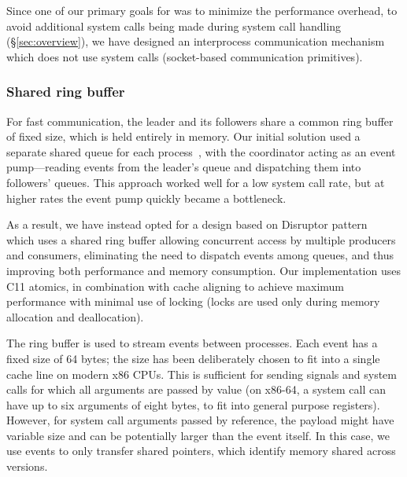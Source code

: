Since one of our primary goals for \vx was to minimize the performance
overhead, to avoid additional system calls being made during system call
handling (\S\ref{sec:overview}), we have designed an interprocess communication
mechanism which does not use system calls (\eg socket-based communication
primitives).

\subsubsection{Shared ring buffer}
\label{sec:ring}

For fast communication, the leader and its followers share a common
ring buffer of fixed size, which is held entirely in memory.  Our
initial solution used a separate shared queue for each
process~\cite{fastforward,mcringbuffer}, with the
coordinator acting as an event pump---reading events from the leader's
queue and dispatching them into followers' queues.  This approach
worked well for a low system call rate, but at higher rates the event
pump quickly became a bottleneck.  

As a result, we have instead opted for a design based on Disruptor
pattern~\cite{disruptor} which uses a shared ring buffer allowing concurrent
access by multiple producers and consumers, eliminating the need to dispatch
events among queues, and thus improving both performance and memory
consumption.  Our implementation uses C11 atomics, 
in combination with cache aligning to
achieve maximum performance with minimal use of locking (locks are used only
during memory allocation and deallocation).

The ring buffer is used to stream events between processes. Each event
has a fixed size of 64 bytes; the size has been deliberately chosen to
fit into a single cache line on modern x86 CPUs.  This is sufficient
for sending signals and system calls for which all arguments are
passed by value (on x86-64, a system call can have up to six arguments
of eight bytes, to fit into general purpose registers).  However, for
system call arguments passed by reference, the payload might have
variable size and can be potentially larger than the event itself.  In
this case, we use events to only transfer shared pointers, which
identify memory shared across versions.


